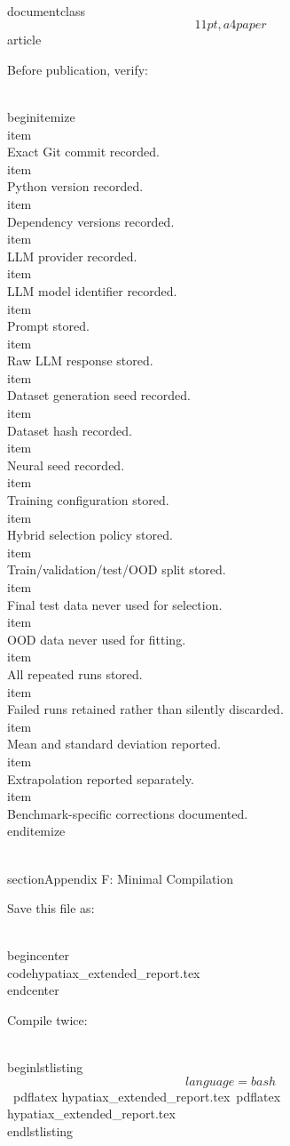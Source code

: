 \\documentclass\[11pt,a4paper\]{article}
\begin{document}
 Before publication, verify:

 \\begin{itemize}\
 \\item \[ \] Exact Git commit recorded.\
 \\item \[ \] Python version recorded.\
 \\item \[ \] Dependency versions recorded.\
 \\item \[ \] LLM provider recorded.\
 \\item \[ \] LLM model identifier recorded.\
 \\item \[ \] Prompt stored.\
 \\item \[ \] Raw LLM response stored.\
 \\item \[ \] Dataset generation seed recorded.\
 \\item \[ \] Dataset hash recorded.\
 \\item \[ \] Neural seed recorded.\
 \\item \[ \] Training configuration stored.\
 \\item \[ \] Hybrid selection policy stored.\
 \\item \[ \] Train/validation/test/OOD split stored.\
 \\item \[ \] Final test data never used for selection.\
 \\item \[ \] OOD data never used for fitting.\
 \\item \[ \] All repeated runs stored.\
 \\item \[ \] Failed runs retained rather than silently discarded.\
 \\item \[ \] Mean and standard deviation reported.\
 \\item \[ \] Extrapolation reported separately.\
 \\item \[ \] Benchmark-specific corrections documented.\
 \\end{itemize}

 \\section{Appendix F: Minimal Compilation}\

 Save this file as:

 \\begin{center}\
 \\code{hypatiax\_extended\_report.tex}\
 \\end{center}

 Compile twice:

 \\begin{lstlisting}\[language=bash\]\
 pdflatex hypatiax\_extended\_report.tex\
 pdflatex hypatiax\_extended\_report.tex\
 \\end{lstlisting}
\end{document}

